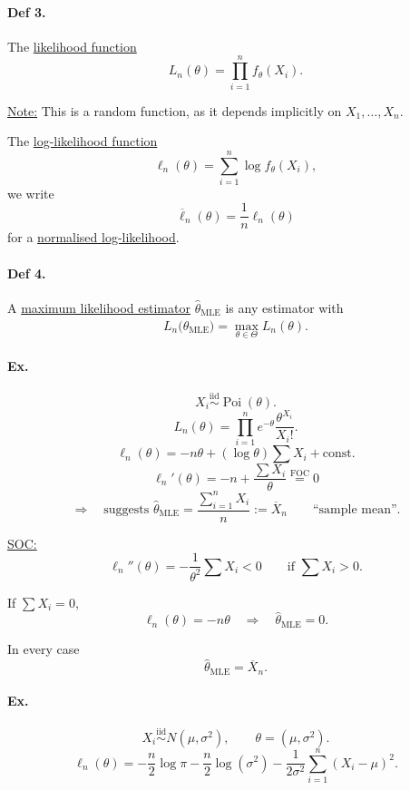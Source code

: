 \documentclass[11pt,a4paper]{article}
\begin{document}
\paragraph{Def 3.}
The \underline{likelihood function}
\[
L_n(\theta)=\prod_{i=1}^{n}f_\theta(X_i).
\]

\noindent\underline{Note:}
This is a random function, as it depends implicitly on $X_1,\ldots,X_n$.

The \underline{log-likelihood function}
\[
\ell_n(\theta)=\sum_{i=1}^{n}\log f_\theta(X_i),
\]
we write
\[
\overline{\ell}_n(\theta)=\frac{1}{n}\ell_n(\theta)
\]
for a \underline{normalised log-likelihood}.

\paragraph{Def 4.}
A \underline{maximum likelihood estimator}
$\widehat{\theta}_{\mathrm{MLE}}$ is any estimator with
\[
L_n\bigl(\widehat{\theta}_{\mathrm{MLE}}\bigr)
=
\max_{\theta\in\Theta}L_n(\theta).
\]

\paragraph{Ex.}
\[
X_i\overset{\mathrm{iid}}{\sim}\operatorname{Poi}(\theta).
\]
\[
L_n(\theta)
=
\prod_{i=1}^{n}e^{-\theta}\frac{\theta^{X_i}}{X_i!}.
\]
\[
\ell_n(\theta)
=
-n\theta+(\log\theta)\sum X_i+\mathrm{const.}
\]
\[
\ell_n'(\theta)
=
-n+\frac{\sum X_i}{\theta}
\overset{\mathrm{FOC}}{=}0
\]
\[
\Longrightarrow\quad
\text{suggests }
\widehat{\theta}_{\mathrm{MLE}}
=
\frac{\displaystyle\sum_{i=1}^{n}X_i}{n}
:=
\overline{X}_n
\qquad
\text{``sample mean''}.
\]

\noindent\underline{SOC:}
\[
\ell_n''(\theta)
=
-\frac{1}{\theta^2}\sum X_i
<0
\qquad
\text{if }\sum X_i>0.
\]

If $\sum X_i=0$,
\[
\ell_n(\theta)=-n\theta
\quad\Longrightarrow\quad
\widehat{\theta}_{\mathrm{MLE}}=0.
\]

In every case
\[
\widehat{\theta}_{\mathrm{MLE}}=\overline{X}_n.
\]

\paragraph{Ex.}
\[
X_i\overset{\mathrm{iid}}{\sim}N(\mu,\sigma^2),
\qquad
\theta=(\mu,\sigma^2).
\]
\[
\ell_n(\theta)
=
-\frac{n}{2}\log\pi
-\frac{n}{2}\log(\sigma^2)
-\frac{1}{2\sigma^2}
\sum_{i=1}^{n}(X_i-\mu)^2.
\]
\end{document}
